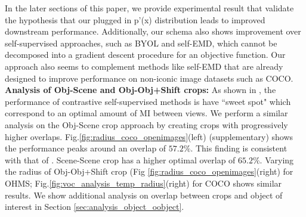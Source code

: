 In the later sections of this paper, we provide experimental result that validate the hypothesis that our plugged in p'(x) distribution leads to improved downstream performance. Additionally, our schema also shows improvement over self-supervised approaches, such as BYOL and self-EMD, which cannot be decomposed into a gradient descent procedure for an objective function. Our approach also seems to complement methods like self-EMD that are already designed to improve performance on non-iconic image datasets such as COCO.
\textbf{Analysis of Obj-Scene and Obj-Obj+Shift crops:} As shown in \cite{tian2019contrastive}, the performance of contrastive self-supervised methods is have ``sweet spot" which correspond to an optimal amount of MI between views. We perform a similar analysis on the Obj-Scene crop approach by creating crops with progressively higher overlaps. Fig.\ref{fig:radius_coco_openimages}(left) (supplementary) shows the performance peaks around an overlap of $57.2\%$. This finding is consistent with that of \cite{tian2019contrastive}. Scene-Scene crop has a higher optimal overlap of $65.2\%$. Varying the radius of Obj-Obj+Shift crop (Fig \ref{fig:radius_coco_openimages}(right) for OHMS; Fig.\ref{fig:voc_analysis_temp_radius}(right) for COCO shows similar results. We show additional analysis on overlap between crops and object of interest in Section \ref{sec:analysis_object_oobject}. 

        
          
         
       
